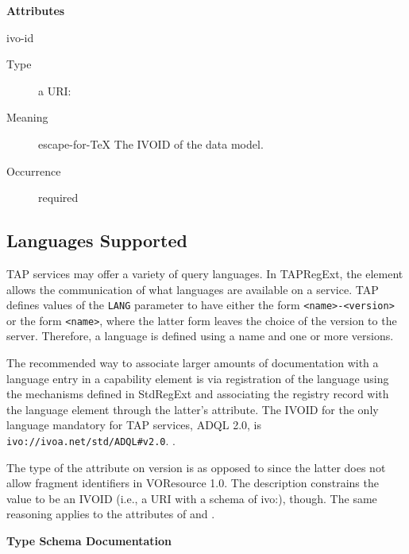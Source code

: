 \documentclass{ivoa}
\begin{document}
\vspace{0.5ex}\noindent\textbf{ Attributes}

\begingroup\small\begin{bigdescription}
\item[ivo-id]
\begin{description}
\item[Type] a URI: 
\item[Meaning] escape-for-TeX{{{
            The IVOID of the data model.
            }}}
\item[Occurrence] required
\end{description}


\end{bigdescription}\endgroup

\endgroup

\subsection{Languages Supported}

\label{langs}

TAP services may offer a variety of query languages.  In TAPRegExt, the
 element allows the communication of what languages are
available on a service.  TAP defines values of the \texttt{LANG} parameter
to have either the form \texttt{<name>-<version>} or the form
\texttt{<name>}, where the latter form leaves the choice of the
version to the server.  Therefore, a language is defined using a name and one
or more versions.

The recommended way to associate larger amounts of documentation with a
language entry in a capability element is via registration of the language
using the mechanisms defined in StdRegExt \citep{std:STDREGEXT} and associating
the registry record with the language element through the latter's 
attribute.  The IVOID for the only language mandatory for TAP services,
ADQL 2.0, is 
\nolinkurl{ivo://ivoa.net/std/ADQL#v2.0}.
.

The type of the  attribute on version is 
 as opposed to  since
the latter does not allow fragment identifiers in VOResource 1.0. 
The description constrains the value to be an
IVOID (i.e., a URI with a schema of ivo:), though.  
The same reasoning applies to the 
attributes of  and .

\begingroup
      	\renewcommand*\descriptionlabel[1]{%
      	\hbox to 5.5em{\emph{#1}\hfil}}\vspace{2ex}\noindent\textbf{ Type Schema Documentation}
\end{document}
